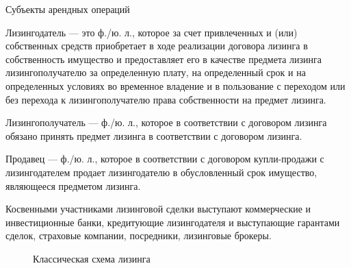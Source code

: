 \documentclass[_Banking_p3.tex]{subfiles}
\begin{document}
\begin{frame}[ allowframebreaks]{Субъекты арендных операций}

\begin{block}{Лизингодатель }
\quad
— это ф./ю. л., которое за счет привлеченных и (или) собственных средств приобретает в ходе реализации договора лизинга в собственность имущество и предоставляет его в качестве предмета лизинга лизингополучателю за определенную плату, на определенный срок и на определенных условиях во временное владение и в пользование с переходом или без перехода к лизингополучателю права собственности на предмет лизинга. 
\end{block}

\pagebreak
\begin{block}{Лизингополучатель }
\quad
— ф./ю. л., которое в соответствии с договором лизинга обязано принять предмет лизинга в соответствии с договором лизинга. 
\end{block}

\begin{block}{Продавец}
\quad
— ф./ю. л., которое в соответствии с договором купли-продажи с лизингодателем продает лизингодателю в обусловленный срок имущество, являющееся предметом лизинга. 
\end{block}
\pagebreak
Косвенными участниками лизинговой сделки выступают коммерческие и инвестиционные банки, кредитующие лизингодателя и выступающие гарантами сделок, страховые компании, посредники, лизинговые брокеры.
\end{frame}
\begin{frame}[shrink=25]
\begin{figure}
\center
\begin{overprint}
\end{overprint}
\vspace*{-2em}
\caption{Классическая схема лизинга}
\end{figure}
\end{frame}
\end{document}
